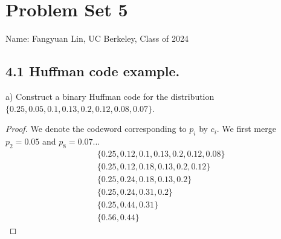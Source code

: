 \documentclass[../main.tex]{subfiles}
\begin{document}
\section*{Problem Set 5}
    Name: Fangyuan Lin, UC Berkeley, Class of 2024

\subsection*{4.1 Huffman code example.}
a) Construct a binary Huffman code for the distribution $\{0.25, 0.05, 0.1, 0.13, 0.2, 0.12, 0.08, 0.07\}$.
\begin{proof}
 We denote the codeword corresponding to $p_i$ by $c_i$. We first merge $p_2=0.05$ and $p_8=0.07$...\begin{align*}
     &\{0.25, 0.12, 0.1, 0.13, 0.2, 0.12, 0.08\}\\
     &\{0.25, 0.12, 0.18, 0.13, 0.2, 0.12\}\\
     &\{0.25, 0.24, 0.18, 0.13, 0.2\}\\
     &\{0.25, 0.24, 0.31, 0.2\}\\
     &\{0.25, 0.44, 0.31\}\\
     &\{0.56, 0.44\}
 \end{align*}

\end{proof}
\end{document}
